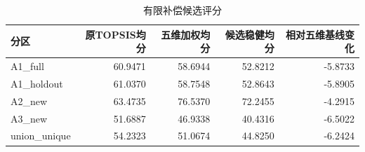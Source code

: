 \begin{table}[htbp]\centering
\caption{有限补偿候选评分}\label{tab:q1_resolution_scores}
\begin{tabular}{lrrrr}
\toprule
分区 & 原TOPSIS均分 & 五维加权均分 & 候选稳健均分 & 相对五维基线变化 \\
\midrule
A1\_full & 60.9471 & 58.6944 & 52.8212 & -5.8733 \\
A1\_holdout & 61.0370 & 58.7548 & 52.8643 & -5.8905 \\
A2\_new & 63.4735 & 76.5370 & 72.2455 & -4.2915 \\
A3\_new & 51.6887 & 46.9338 & 40.4316 & -6.5022 \\
union\_unique & 54.2323 & 51.0674 & 44.8250 & -6.2424 \\
\bottomrule\end{tabular}\end{table}
